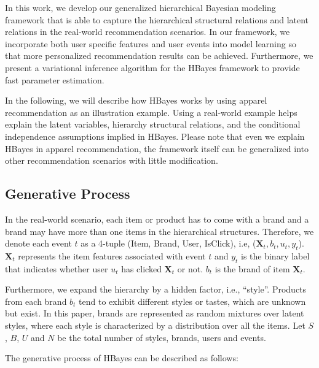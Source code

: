 In this work, we develop our generalized hierarchical Bayesian modeling framework that is able to capture the hierarchical structural relations and latent relations in the real-world recommendation scenarios. In our framework, we incorporate both user specific features and user events into model learning so that more personalized recommendation results can be achieved. Furthermore, we present a variational inference algorithm for the HBayes framework to provide fast parameter estimation.

In the following, we will describe how HBayes works by using apparel recommendation as an illustration example. Using a real-world example helps explain the latent variables, hierarchy structural relations, and the conditional independence assumptions implied in HBayes. Please note that even we explain HBayes in apparel recommendation, the framework itself can be generalized into other recommendation scenarios with little modification. 



\subsection{Generative Process}

In the real-world scenario, each item or product has to come with a brand and a brand may have more than one items in the hierarchical structures. Therefore, we denote each event $t$ as a 4-tuple (Item, Brand, User, IsClick), i.e, ($\mathbf{X}_t, b_t, u_t, y_t$). $\mathbf{X}_t$ represents the item features associated with event $t$ and $y_t$ is the binary label that indicates whether user $u_t$ has clicked $\mathbf{X}_t$ or not. $b_t$ is the brand of item $\mathbf{X}_t$. 

Furthermore, we expand the hierarchy by a hidden factor, i.e., ``style''. Products from each brand $b_t$ tend to exhibit different styles or tastes, which are unknown but exist. In this paper, brands are represented as random mixtures over latent styles, where each style is characterized by a distribution over all the items. Let $S$, $B$, $U$ and $N$ be the total number of styles, brands, users and events.

The generative process of HBayes can be described as follows:

